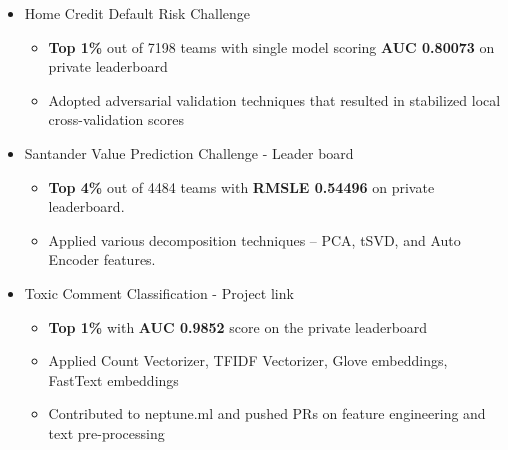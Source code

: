 \documentclass[letterpaper,11pt]{article}
\newcommand{\resumeSubHeadingListStart}{\begin{itemize}[leftmargin=*]}
\newcommand{\resumeSubHeadingListEnd}{\end{itemize}}
\begin{document}
\begin{itemize}  \setlength\itemsep{-4pt}
   \item Home Credit Default Risk Challenge
   \begin{itemize}\setlength\itemsep{-3pt}\vspace{-8pt}
     \item \textbf{Top 1\%} out of 7198 teams with single model scoring \textbf{AUC 0.80073} on private leaderboard
     \item Adopted adversarial validation techniques that resulted in stabilized local cross-validation scores
   \end{itemize}\vspace{-6pt}

   \item Santander Value Prediction Challenge - Leader board
   \begin{itemize}\setlength\itemsep{-3pt}\vspace{-8pt}
     \item \textbf{Top 4\%} out of 4484 teams with \textbf{RMSLE 0.54496} on private leaderboard.
     \item Applied various decomposition techniques – PCA, tSVD, and Auto Encoder features.
   \end{itemize}\vspace{-6pt}

   \item Toxic Comment Classification - Project link
   \begin{itemize}\setlength\itemsep{-3pt}\vspace{-8pt}
     \item \textbf{Top 1\%} with \textbf{AUC 0.9852} score on the private leaderboard
     \item Applied Count Vectorizer, TFIDF Vectorizer, Glove embeddings, FastText embeddings
     \item Contributed to neptune.ml and pushed PRs on feature engineering and text pre-processing
   \end{itemize}\vspace{-6pt}

\end{itemize}







%
%

\end{document}
